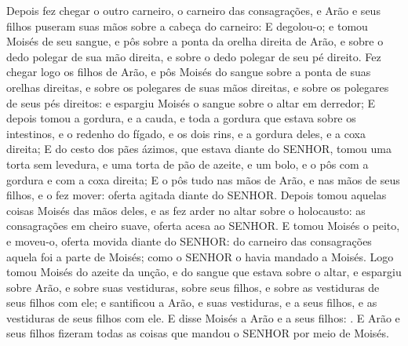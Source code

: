 {  Depois fez chegar o outro carneiro, o carneiro das consagrações, e Arão e seus filhos puseram suas mãos sobre a cabeça do carneiro:
  E degolou-o; e tomou Moisés de seu sangue, e pôs sobre a ponta da orelha direita de Arão, e sobre o dedo polegar de sua mão direita, e sobre o dedo polegar de seu pé direito.
  Fez chegar logo os filhos de Arão, e pôs Moisés do sangue sobre a ponta de suas orelhas direitas, e sobre os polegares de suas mãos direitas, e sobre os polegares de seus pés direitos: e espargiu Moisés o sangue sobre o altar em derredor;
  E depois tomou a gordura, e a cauda, e toda a gordura que estava sobre os intestinos, e o redenho do fígado, e os dois rins, e a gordura deles, e a coxa direita;
  E do cesto dos pães ázimos, que estava diante do SENHOR, tomou uma torta sem levedura, e uma torta de pão de azeite, e um bolo, e o pôs com a gordura e com a coxa direita;
  E o pôs tudo nas mãos de Arão, e nas mãos de seus filhos, e o fez mover: oferta agitada diante do SENHOR.
  Depois tomou aquelas coisas Moisés das mãos deles, e as fez arder no altar sobre o holocausto: as consagrações em cheiro suave, oferta acesa ao SENHOR.
  E tomou Moisés o peito, e moveu-o, oferta movida diante do SENHOR: do carneiro das consagrações aquela foi a parte de Moisés; como o SENHOR o havia mandado a Moisés.
  Logo tomou Moisés do azeite da unção, e do sangue que estava sobre o altar, e espargiu sobre Arão, e sobre suas vestiduras, sobre seus filhos, e sobre as vestiduras de seus filhos com ele; e santificou a Arão, e suas vestiduras, e a seus filhos, e as vestiduras de seus filhos com ele.
  E disse Moisés a Arão e a seus filhos: .
  E Arão e seus filhos fizeram todas as coisas que mandou o SENHOR por meio de Moisés.
\par }

